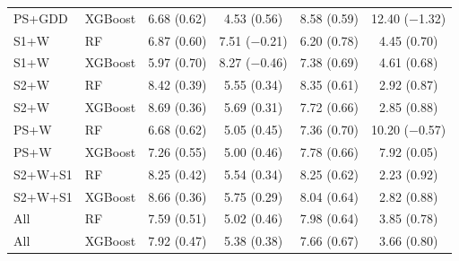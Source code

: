 \begin{table}[htbp]
\begin{tabular}{l l c c c c}
PS+GDD & XGBoost & 6.68 (0.62) & 4.53 (0.56) & 8.58 (0.59) & 12.40 ($-$1.32) \\
S1+W & RF & 6.87 (0.60) & 7.51 ($-$0.21) & 6.20 (0.78) & 4.45 (0.70) \\
S1+W & XGBoost & 5.97 (0.70) & 8.27 ($-$0.46) & 7.38 (0.69) & 4.61 (0.68) \\
S2+W & RF & 8.42 (0.39) & 5.55 (0.34) & 8.35 (0.61) & 2.92 (0.87) \\
S2+W & XGBoost & 8.69 (0.36) & 5.69 (0.31) & 7.72 (0.66) & 2.85 (0.88) \\
PS+W & RF & 6.68 (0.62) & 5.05 (0.45) & 7.36 (0.70) & 10.20 ($-$0.57) \\
PS+W & XGBoost & 7.26 (0.55) & 5.00 (0.46) & 7.78 (0.66) & 7.92 (0.05) \\
S2+W+S1 & RF & 8.25 (0.42) & 5.54 (0.34) & 8.25 (0.62) & 2.23 (0.92) \\
S2+W+S1 & XGBoost & 8.66 (0.36) & 5.75 (0.29) & 8.04 (0.64) & 2.82 (0.88) \\
All & RF & 7.59 (0.51) & 5.02 (0.46) & 7.98 (0.64) & 3.85 (0.78) \\
All & XGBoost & 7.92 (0.47) & 5.38 (0.38) & 7.66 (0.67) & 3.66 (0.80) \\
\bottomrule
\end{tabular}
\end{table}
